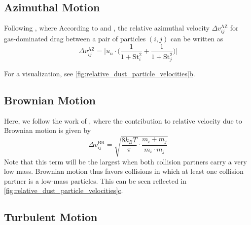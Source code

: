     \subsection{Azimuthal Motion}

        Following \cite{birnstiel_dullemond_brauer_2010}, where 
        According to \cite{weidenschilling_1977} and \cite{nakagawa_1986}, the relative azimuthal 
        velocity $\Delta v^\text{AZ}_{ij}$ for gas-dominated drag between a pair of particles 
        $(i, j)$ can be written as
        \begin{equation}
            \Delta v^\text{AZ}_{ij}=\bigg|
                u_n\cdot\bigg(
                    \frac{1}{1+\text{St}_i^2}+
                    \frac{1}{1+\text{St}_j^2}
                \bigg)
            \bigg|
        \end{equation}

    
        For a visualization, see \hyperref[fig:relative_dust_particle_velocities]
        {\cref*{fig:relative_dust_particle_velocities}b}.

    \subsection{Brownian Motion}

        Here, we follow the work of \cite{dullemond_dominik_2004}, where the contribution to 
        relative velocity due to Brownian motion is given by
        \begin{equation}
            \Delta v_{ij}^\text{BR}
            =\sqrt{\frac{8k_BT}{\pi}\cdot\frac{m_i+m_j}{m_i\cdot m_j}}
        \end{equation}
        Note that this term will be the largest when both collision partners carry a very low mass.
        Brownian motion thus favors collisions in which at least one collision partner is a 
        low-mass particles. This can be seen reflected in 
        \hyperref[fig:relative_dust_particle_velocities]{
        \cref*{fig:relative_dust_particle_velocities}c}.

    \subsection{Turbulent Motion}

